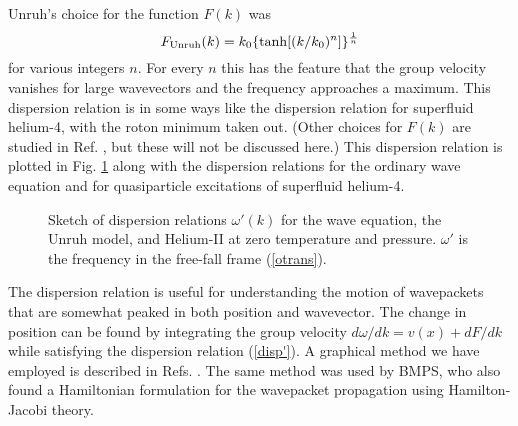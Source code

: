 Unruh's choice\cite{Unruh2} for the function $F(k)$ was
\begin{equation}
F_{\rm Unruh}(k)=k_0\{\tanh[(k/k_0)^n]\}^{1\over n}
\label{FUN}
\end{equation}
for various integers $n$. For every $n$ this has the feature that the
group velocity vanishes for large wavevectors and the frequency
approaches a maximum.  This dispersion relation is in some ways like
the dispersion relation for superfluid helium-4, with the roton minimum
taken out.  (Other choices for $F(k)$ are studied in Ref.
\cite{CorlJaco}, but these will not be discussed here.) This dispersion
relation is plotted in Fig. \ref{disps} along with the dispersion
relations for the ordinary wave equation and for quasiparticle
excitations of superfluid helium-4.
\begin{figure}[tb]
\centerline{
}
\caption{Sketch of dispersion relations $\omega'(k)$ for the wave equation,
the Unruh model, and Helium-II at zero temperature and pressure. 
$\omega'$ is the frequency in the free-fall frame (\ref{otrans}).}
\label{disps}
\end{figure}


The dispersion relation is useful for understanding the motion of
wavepackets that are somewhat peaked in both position and wavevector.
The change in position can be found by integrating the group velocity
$d\omega/dk=v(x)+dF/dk$ while satisfying the dispersion relation
(\ref{disp'}).  A graphical method we have employed is described in
Refs.  \cite{Jaco-mex,CorlJaco}.  The same method was used by
BMPS\cite{BMPS}, who also found a Hamiltonian formulation for the
wavepacket propagation using Hamilton-Jacobi theory.

